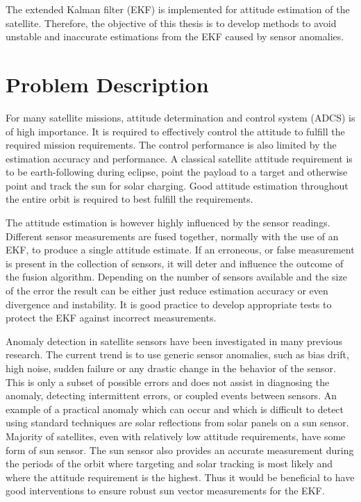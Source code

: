 The extended Kalman filter (EKF) is implemented for attitude estimation of the satellite. Therefore, the objective of this thesis is to develop methods to avoid unstable and inaccurate estimations from the EKF caused by sensor anomalies.

\section{Problem Description}
For many satellite missions, attitude determination and control system (ADCS) is of high importance. It is required to effectively control the attitude to fulfill the required mission requirements.  The control performance is also limited by the estimation accuracy and performance.  A classical satellite attitude requirement is to be earth-following during eclipse, point the payload to a target and otherwise point and track the sun for solar charging. Good attitude estimation throughout the entire orbit is required to best fulfill the requirements.

The attitude estimation is however highly influenced by the sensor readings. Different sensor measurements are fused together, normally with the use of an EKF, to produce a single attitude estimate.  If an erroneous, or false measurement is present in the collection of sensors, it will deter and influence the outcome of the fusion algorithm.  Depending on the number of sensors available and the size of the error the result can be either just reduce estimation accuracy or even divergence and instability. It is good practice to develop appropriate tests to protect the EKF against incorrect measurements. 

Anomaly detection in satellite sensors have been investigated in many previous research.  The current trend is to use generic sensor anomalies, such as bias drift, high noise, sudden failure or any drastic change in the behavior of the sensor. This is only a subset of possible errors and does not assist in diagnosing the anomaly, detecting intermittent errors, or coupled events between sensors. An example of a practical anomaly which can occur and which is difficult to detect using standard techniques are solar reflections from solar panels on a sun sensor. Majority of satellites, even with relatively low attitude requirements, have some form of sun sensor.  The sun sensor also provides an accurate measurement during the periods of the orbit where targeting and solar tracking is most likely and where the attitude requirement is the highest.  Thus it would be beneficial to have good interventions to ensure robust sun vector measurements for the EKF.

